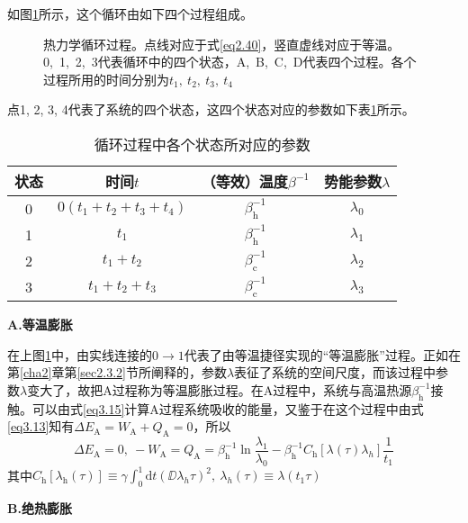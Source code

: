 如图\ref{p3.1}所示，这个循环由如下四个过程组成。
\begin{figure}[!htbp]
    \centering
    \def\svgwidth{0.6\columnwidth}
    
    \caption{热力学循环过程。点线对应于式\eqref{eq2.40}，竖直虚线对应于等温。0,\ 1,\ 2,\ 3代表循环中的四个状态，A,\ B,\ C,\ D代表四个过程。各个过程所用的时间分别为$t_1,\ t_2,\ t_3,\ t_4$}
    \label{p3.1}
\end{figure}
点1, 2, 3, 4代表了系统的四个状态，这四个状态对应的参数如下表\ref{t3.1}所示。
\begin{table}[!htbp]
    \centering
    \caption{循环过程中各个状态所对应的参数}
    \begin{tabular}{cccc}
    \hline
    状态 & 时间$t$ & （等效）温度$\beta^{-1}$      & 势能参数$\lambda$ \\ 
    \hline
    0                   & $0(t_1+t_2+t_3+t_4)$       & $\beta_{\mathrm{h}}^{-1}$  & $\lambda_0$   \\ 

    1                   & $t_1$   & $\beta_{\mathrm{h}}^{-1}$ & $\lambda_1$   \\ 

    2                   & $t_1+t_2$   & $\beta_{\mathrm{c}}^{-1}$ & $\lambda_2$   \\ 

    3                   & $t_1+t_2+t_3$   & $\beta_{\mathrm{c}}^{-1}$ & $\lambda_3$   \\ 
    \hline
    \end{tabular}
    \label{t3.1}
\end{table}

\begin{center}
    {\bfseries A.等温膨胀}
\end{center}

在上图\ref{p3.1}中，由实线连接的$0 \to 1$代表了由等温捷径实现的“等温膨胀”过程。正如在第\ref{cha2}章第\ref{sec2.3.2}节所阐释的，参数$\lambda$表征了系统的空间尺度，而该过程中参数$\lambda$变大了，故把A过程称为等温膨胀过程。在A过程中，系统与高温热源$\beta_\mathrm{h}^{-1}$接触。可以由式\eqref{eq3.15}计算A过程系统吸收的能量，又鉴于在这个过程中由式\eqref{eq3.13}知有$\Delta E_{\mathrm{A}} = W_{\mathrm{A}} + Q_{\mathrm{A}}=0$，所以
\begin{equation}
    \Delta E_{\mathrm{A}}=0,\ -W_{\mathrm{A}}=Q_{\mathrm{A}} = \beta_{\mathrm{h}}^{-1} \ln{\frac{\lambda_1}{\lambda_0}} - \beta_{\mathrm{h}}^{-1} C_{\mathrm{h}} [\lambda(\tau)\lambda_{h}] \frac{1}{t_1}     
    \label{eq3.16}
\end{equation}
其中$C_{\mathrm{h}} [\lambda_{\mathrm{h}}(\tau)] \equiv \gamma \int_{0}^{1} \mathrm{d} t \left(\DD{\lambda_{h}}{\tau}\right)^2,\ \lambda_{h}(\tau)\equiv\lambda({t_1 \tau})$
\begin{center}
    {\bfseries B.绝热膨胀}
\end{center}


